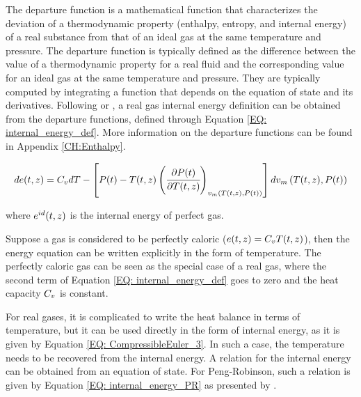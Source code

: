 \documentclass[../Article_Model_Parameters.tex]{subfiles}
\begin{document}
			The departure function is a mathematical function that characterizes the deviation of a thermodynamic property (enthalpy, entropy, and internal energy) of a real substance from that of an ideal gas at the same temperature and pressure. The departure function is typically defined as the difference between the value of a thermodynamic property for a real fluid and the corresponding value for an ideal gas at the same temperature and pressure. They are typically computed by integrating a function that depends on the equation of state and its derivatives. Following \citet{Elliott2011} or \citet{Gmehling2019}, a real gas internal energy definition can be obtained from the departure functions, defined through Equation \ref{EQ: internal_energy_def}. More information on the departure functions can be found in Appendix \ref{CH:Enthalpy}.

			{\footnotesize
				\begin{equation}
					d{\color{black}e}(t,z)=C_vd{\color{black}T}-\left[{\color{black}P}(t)-{\color{black}T}(t,z)\left(\cfrac{\partial {\color{black}P}(t)}{\partial {\color{black}T}(t,z)}\right)_{{\color{black}v_m}\left({\color{black}T}(t,z), {\color{black}P}(t)\right)}\right]d{\color{black}v_m}\left({\color{black}T}(t,z), {\color{black}P}(t)\right)
					\label{EQ: internal_energy_def}
				\end{equation} }
			
			where ${\color{black}e}^{id}(t,z)$ is the internal energy of perfect gas.
			
			Suppose a gas is considered to be perfectly caloric (${\color{black}e}(t,z)={\color{black}C_v} {\color{black}T}(t,z)$), then the energy equation can be written explicitly in the form of temperature. The perfectly caloric gas can be seen as the special case of a real gas, where the second term of Equation \ref{EQ: internal_energy_def} goes to zero and the heat capacity ${\color{black}C_v}$ is constant.
			
			For real gases, it is complicated to write the heat balance in terms of temperature, but it can be used directly in the form of internal energy, as it is given by Equation \ref{EQ: CompressibleEuler_3}. In such a case, the temperature needs to be recovered from the internal energy. A relation for the internal energy can be obtained from an equation of state. For Peng-Robinson, such a relation is given by Equation \ref{EQ: internal_energy_PR} as presented by \citet{Elliott2011}.
			
		
\end{document}
